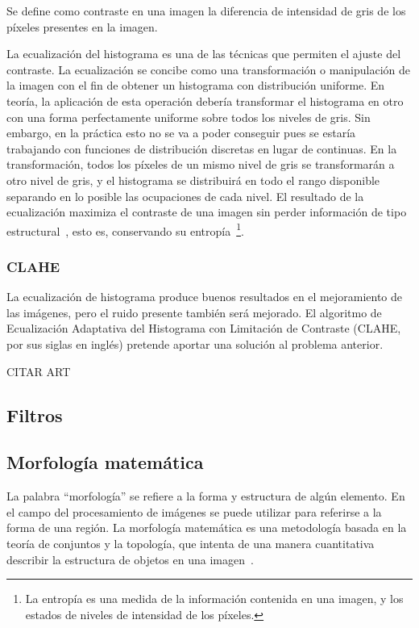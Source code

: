\begin{definition}
	Se define como contraste en una imagen la diferencia de intensidad de gris de los píxeles presentes en la imagen.
\end{definition}

La ecualización del histograma es una de las técnicas que permiten el ajuste del contraste. La ecualización se concibe como una transformación o manipulación de la imagen con el fin de obtener un histograma con distribución uniforme. En teoría, la aplicación de esta operación debería transformar el histograma en otro con una forma perfectamente uniforme sobre todos los niveles de gris. Sin embargo, en la práctica esto no se va a poder conseguir pues se estaría trabajando con funciones de distribución discretas en lugar de continuas. En la transformación, todos los píxeles de un mismo nivel de gris se transformarán a otro nivel de gris, y el histograma se distribuirá en todo el rango disponible separando en lo posible las ocupaciones de cada nivel. El resultado de la ecualización maximiza el contraste de una imagen sin perder información de tipo estructural~\cite{solomon2011fundamentals}, esto es, conservando su entropía~\footnote{La entropía es una medida de la información contenida en una imagen, y los estados de niveles de intensidad de los píxeles.}.

\subsubsection{CLAHE}

La ecualización de histograma produce buenos resultados en el mejoramiento de las imágenes, pero el ruido presente también será mejorado. El algoritmo de Ecualización Adaptativa del Histograma con Limitación de Contraste (CLAHE, por sus siglas en inglés) pretende aportar una solución al problema anterior.

CITAR ART \cite{pizer1987adaptive}

\subsection{Filtros}

\subsection{Morfología matemática}

La palabra ``morfología'' se refiere a la forma y estructura de algún elemento. En el campo del procesamiento de imágenes se puede utilizar para referirse a la forma de una región. La morfología matemática es una metodología basada en la teoría de conjuntos y la topología, que intenta de una manera cuantitativa describir la estructura de objetos en una imagen~\cite{}.

